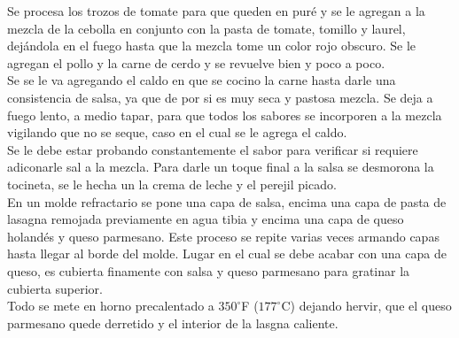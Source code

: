 Se procesa los trozos de tomate para que queden en puré y se le agregan a la mezcla  de la cebolla en conjunto con la pasta de tomate, tomillo y laurel, dejándola en el fuego hasta que la mezcla tome un color rojo obscuro. Se le agregan el pollo y la carne de cerdo y se revuelve bien y poco a poco.\\

Se se le va agregando el caldo en que se cocino la carne hasta darle una consistencia de salsa, ya que de por si es muy seca y pastosa mezcla. Se deja a fuego lento, a medio tapar, para que todos los sabores se incorporen a la mezcla vigilando que no se seque, caso en el cual se le agrega el caldo.\\

Se le debe estar probando constantemente el sabor para verificar si requiere adiconarle sal a la mezcla. Para darle un toque final a la salsa se desmorona la tocineta, se le hecha un la crema de leche y el perejil picado.\\

En un molde refractario se pone una capa de salsa, encima una capa de pasta de lasagna remojada previamente en agua tibia y encima una capa de queso holandés y queso parmesano. Este proceso se repite varias veces armando capas hasta llegar al borde del molde. Lugar en el cual se debe acabar con una capa de queso,  es cubierta finamente con salsa y queso parmesano para gratinar la cubierta superior.\\

Todo se mete en horno precalentado a $350^\circ$F ($177^\circ$C) dejando hervir, que el queso parmesano quede derretido y el interior de la lasgna caliente.\\





